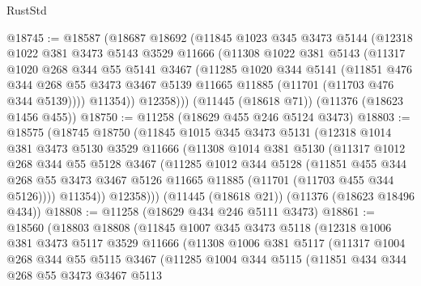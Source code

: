 \begin{lexlean}{RustStd}
\begin{coremodule}
{{{{{{{{{{{{{{{{{{{@18745 := @18587
    (@18687
      @18692
      (@11845
        @1023
        @345
        @3473
        @5144
        (@12318
          @1022
          @381
          @3473
          @5143
          @3529
          @11666
          (@11308
            @1022
            @381
            @5143
            (@11317
              @1020
              @268
              @344
              @55
              @5141
              @3467
              (@11285
                @1020
                @344
                @5141
                (@11851
                  @476
                  @344
                  @268
                  @55
                  @3473
                  @3467
                  @5139
                  @11665
                  @11885
                  (@11701 (@11703 @476 @344 @5139))))
              @11354))
          @12358)))
    (@11445 (@18618 @71))
    (@11376 (@18623 @1456 @455))
@18750 := @11258 (@18629 @455 @246 @5124 @3473)
@18803 := @18575
    (@18745
      @18750
      (@11845
        @1015
        @345
        @3473
        @5131
        (@12318
          @1014
          @381
          @3473
          @5130
          @3529
          @11666
          (@11308
            @1014
            @381
            @5130
            (@11317
              @1012
              @268
              @344
              @55
              @5128
              @3467
              (@11285
                @1012
                @344
                @5128
                (@11851
                  @455
                  @344
                  @268
                  @55
                  @3473
                  @3467
                  @5126
                  @11665
                  @11885
                  (@11701 (@11703 @455 @344 @5126))))
              @11354))
          @12358)))
    (@11445 (@18618 @21))
    (@11376 (@18623 @18496 @434))
@18808 := @11258 (@18629 @434 @246 @5111 @3473)
@18861 := @18560
    (@18803
      @18808
      (@11845
        @1007
        @345
        @3473
        @5118
        (@12318
          @1006
          @381
          @3473
          @5117
          @3529
          @11666
          (@11308
            @1006
            @381
            @5117
            (@11317
              @1004
              @268
              @344
              @55
              @5115
              @3467
              (@11285
                @1004
                @344
                @5115
                (@11851
                  @434
                  @344
                  @268
                  @55
                  @3473
                  @3467
                  @5113
}}}}}}}}}}}}}}}}}}}
\end{coremodule}
\end{lexlean}
